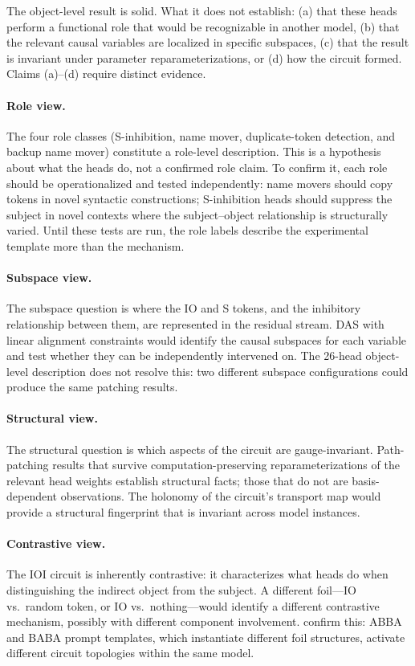 \documentclass{article}
\begin{document}
The object-level result is solid.  What it does not establish: (a) that
these heads perform a functional role that would be recognizable in
another model, (b) that the relevant causal variables are localized in
specific subspaces, (c) that the result is invariant under parameter
reparameterizations, or (d) how the circuit formed.  Claims (a)--(d)
require distinct evidence.

\paragraph{Role view.}
The four role classes (S-inhibition, name mover, duplicate-token
detection, and backup name mover) constitute a role-level description.
This is a hypothesis about what the heads do, not a confirmed role claim.
To confirm it, each role should be operationalized and tested
independently: name movers should copy tokens in novel syntactic
constructions; S-inhibition heads should suppress the subject in novel
contexts where the subject--object relationship is structurally varied.
Until these tests are run, the role labels describe the experimental
template more than the mechanism.

\paragraph{Subspace view.}
The subspace question is where the IO and S tokens, and the inhibitory
relationship between them, are represented in the residual stream.
DAS with linear alignment constraints would identify the causal
subspaces for each variable and test whether they can be independently
intervened on.  The 26-head object-level description does not resolve
this: two different subspace configurations could produce the same
patching results.

\paragraph{Structural view.}
The structural question is which aspects of the circuit are
gauge-invariant.  Path-patching results that survive
computation-preserving reparameterizations of the relevant head weights
establish structural facts; those that do not are basis-dependent
observations.  The holonomy of the circuit's transport map would provide
a structural fingerprint that is invariant across model instances.

\paragraph{Contrastive view.}
The IOI circuit is inherently contrastive: it characterizes what heads
do when distinguishing the indirect object from the subject.  A
different foil---IO vs.\ random token, or IO vs.\ nothing---would
identify a different contrastive mechanism, possibly with different
component involvement.  \citet{franco2026} confirm this: ABBA and BABA
prompt templates, which instantiate different foil structures, activate
different circuit topologies within the same model.
\end{document}
